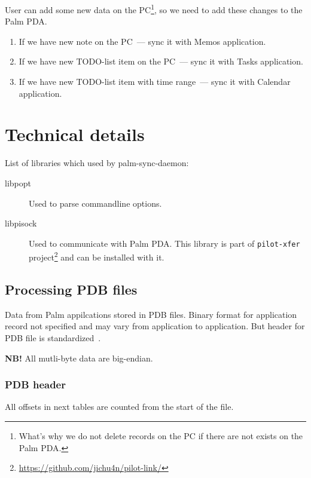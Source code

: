 \documentclass[a4paper,12pt,oneside]{scrartcl}
\begin{document}
\begin{enumerate}
  User can add some new data on the PC\footnote{What's why we do not delete
    records on the PC if there are not exists on the Palm PDA.}, so we need to
  add these changes to the Palm PDA.

  \begin{enumerate}
  \item If we have new note on the PC~--- sync it with Memos application.
  \item If we have new TODO-list item on the PC~--- sync it with Tasks
    application.
  \item If we have new TODO-list item with time range~--- sync it with Calendar
    application.
  \end{enumerate}
\end{enumerate}

\section{Technical details}
\label{sec:technical-details}

List of libraries which used by palm-sync-daemon:

\begin{description}
\item[libpopt] Used to parse commandline options.
\item[libpisock] Used to communicate with Palm PDA. This library is part of
  \texttt{pilot-xfer}
  project\footnote{\url{https://github.com/jichu4n/pilot-link/}} and can be
  installed with it.
\end{description}

\subsection{Processing PDB files}
\label{sec:parsing-pdb-files}

Data from Palm appilcations stored in PDB files. Binary format for application
record not specified and may vary from application to application. But header
for PDB file is standardized~\cite{PalmFileFormatSpec}.

\textbf{NB!} All mutli-byte data are big-endian.

\subsubsection{PDB header}
\label{sec:pdb-header}

All offsets in next tables are counted from the start of the file.
\end{document}
